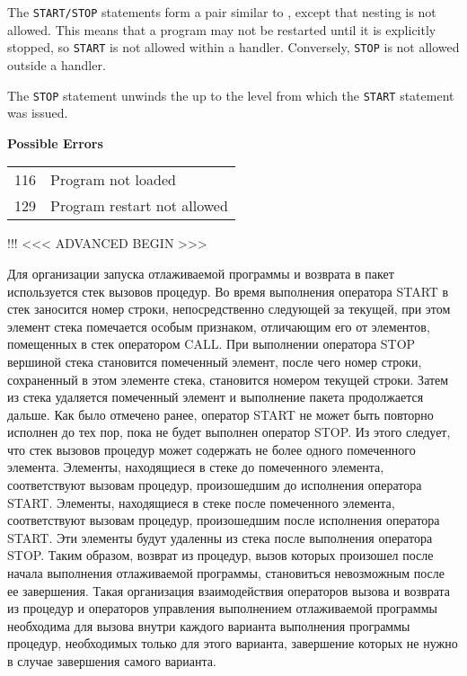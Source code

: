 The \verb'START/STOP' statements form a pair similar to ,
except that nesting is not allowed. This means that a program may not be
restarted until it is explicitly stopped, so \verb'START' is not allowed within
a handler. Conversely, \verb'STOP' is not allowed outside a handler.

The \verb'STOP' statement unwinds the  up to the
level from which the \verb'START' statement was issued.

{\samepage
{\bf Possible Errors}
\begin{flushleft}
\begin{tabular}{ll}
116 & Program not loaded \\
129 & Program restart not allowed
\end{tabular}
\end{flushleft}
} %
{} %


\ifcomment !!!
<<< ADVANCED BEGIN >>>

        Для организации запуска отлаживаемой программы и возврата в пакет
используется стек вызовов процедур. Во время выполнения оператора
START в стек заносится номер строки, непосредственно следующей за
текущей, при этом элемент стека помечается особым признаком, отличающим его от
элементов, помещенных в стек оператором CALL. При выполнении оператора
STOP вершиной стека становится помеченный элемент, после чего
номер строки, сохраненный в этом элементе стека, становится номером текущей
строки. Затем из стека удаляется помеченный элемент и выполнение пакета
продолжается дальше.
        Как было отмечено ранее, оператор START не может быть повторно
исполнен до тех пор, пока не будет выполнен оператор STOP. Из этого
следует, что стек вызовов процедур может содержать не более одного помеченного
элемента. Элементы, находящиеся в стеке до помеченного элемента, соответствуют
вызовам процедур, произошедшим до исполнения оператора START. Элементы,
находящиеся в стеке после помеченного элемента, соответствуют вызовам процедур,
произошедшим после исполнения оператора START. Эти элементы будут
удаленны из стека после выполнения оператора STOP. Таким образом,
возврат из процедур, вызов которых произошел после начала выполнения
отлаживаемой программы, становиться невозможным после  ее завершения. Такая
организация взаимодействия операторов вызова и возврата из процедур и
операторов управления выполнением отлаживаемой программы необходима для вызова
внутри каждого варианта выполнения программы процедур, необходимых только для
этого варианта, завершение которых не нужно в случае завершения самого варианта.


